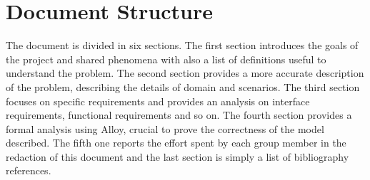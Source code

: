 \section{Document Structure}
The document is divided in six sections. \newline
The first section introduces the goals of the project and shared phenomena with also a list of definitions useful to understand the problem.\newline
The second section provides a more accurate description of the problem, describing the details of domain and scenarios.\newline
The third section focuses on specific requirements and provides an analysis on interface requirements, functional requirements and so on.\newline
The fourth section provides a formal analysis using Alloy, crucial to prove the correctness of the model described.\newline
The fifth one reports the effort spent by each group member in the redaction of this document and the last section is simply a list of bibliography references.